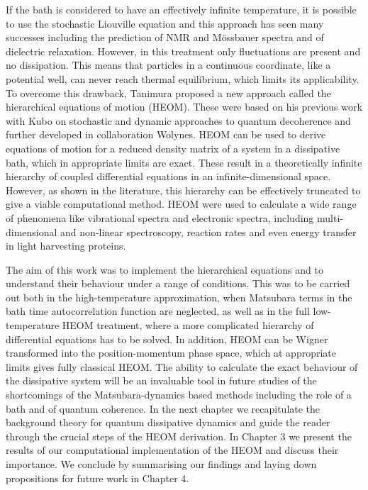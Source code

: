 If the bath is considered to have an effectively infinite temperature, it is possible to use the stochastic Liouville equation\supercite{Kubo1963} and this approach has seen many successes including the prediction of NMR and M\"ossbauer spectra and of dielectric relaxation.\supercite{Tanimura2006a} However, in this treatment only fluctuations are present and no dissipation. This means that particles in a continuous coordinate, like a potential well, can never reach thermal equilibrium, which limits its applicability.\supercite{Tanimura2006a} To overcome this drawback, Tanimura proposed a new approach called the hierarchical equations of motion (HEOM).\supercite{Tanimura1990a} These were based on his previous work with Kubo\supercite{Tanimura1989, Tanimura1989b} on stochastic and dynamic approaches to quantum decoherence and further developed in collaboration Wolynes.\supercite{Tanimura1991a,Tanimura1992} HEOM can be used to derive equations of motion for a reduced density matrix of a system in a dissipative bath, which in appropriate limits are exact. These result in a theoretically infinite hierarchy of coupled differential equations in an infinite-dimensional space. However, as shown in the literature, this hierarchy can be effectively truncated to give a viable computational method.\supercite{Tanimura1991a,Tanimura1992,Tanimura2006a} HEOM were used to calculate a wide range of phenomena like vibrational spectra and electronic spectra, including multi-dimensional and non-linear spectroscopy,\supercite{Sakurai2011} reaction rates\supercite{Chen2009a} and even energy transfer in light harvesting proteins.\supercite{Kreisbeck2011}
	
The aim of this work was to implement the hierarchical equations and to understand their behaviour under a range of conditions. This was to be carried out both in the high-temperature approximation, when Matsubara terms in the bath time autocorrelation function are neglected, as well as in the full low-temperature HEOM treatment, where a more complicated hierarchy of differential equations has to be solved. In addition, HEOM can be Wigner transformed into the position-momentum phase space, which at appropriate limits gives fully classical HEOM. The ability to calculate the exact behaviour of the dissipative system will be an invaluable tool in future studies of the shortcomings of the Matsubara-dynamics based methods including the role of a bath and of quantum coherence.
\newpage
In the next chapter we recapitulate the background theory for quantum dissipative dynamics and guide the reader through the crucial steps of the HEOM derivation. In Chapter 3 we present the results of our computational implementation of the HEOM and discuss their importance. We conclude by summarising our findings and laying down propositions for future work in Chapter 4.